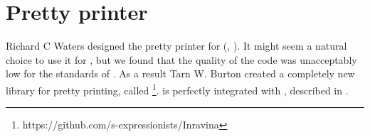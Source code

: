 \chapter{Pretty printer}

Richard C Waters designed the pretty printer for
\commonlisp{} (\cite{Waters89xp:a}, \cite{Waters:1992:UNC:1039991.1039996}).
It might seem a natural choice to use it for \sysname{}, but we found
that the quality of the code was unacceptably low for the standards of
\sysname{}.  As a result Tarn W. Burton created a completely new
library for pretty printing, called \inravina{}%
\footnote{https://github.com/s-expressionists/Inravina}.  \inravina{}
is perfectly integrated with \incless{}, described in
.
